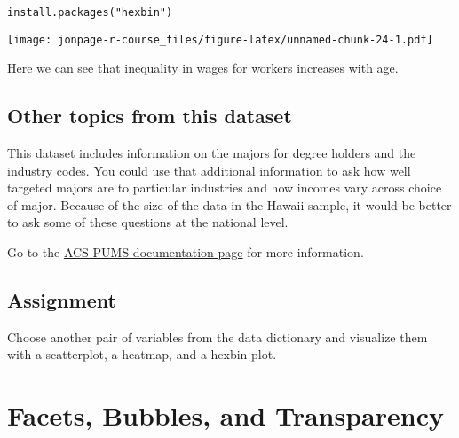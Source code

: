 \documentclass[]{book}
\newenvironment{Shaded}{\begin{snugshade}}{\end{snugshade}}
\newcommand{\KeywordTok}[1]{\textcolor[rgb]{0.13,0.29,0.53}{\textbf{{#1}}}}
\newcommand{\DecValTok}[1]{\textcolor[rgb]{0.00,0.00,0.81}{{#1}}}
\newcommand{\StringTok}[1]{\textcolor[rgb]{0.31,0.60,0.02}{{#1}}}
\newcommand{\NormalTok}[1]{{#1}}
\theoremstyle{definition}
\theoremstyle{definition}
\theoremstyle{remark}
\begin{document}
\begin{verbatim}
install.packages("hexbin")
\end{verbatim}

\begin{Shaded}
\end{Shaded}

\texttt{[image: jonpage-r-course\_files/figure-latex/unnamed-chunk-24-1.pdf]}

Here we can see that inequality in wages for workers increases with age.

\section{Other topics from this
dataset}\label{other-topics-from-this-dataset}

This dataset includes information on the majors for degree holders and
the industry codes. You could use that additional information to ask how
well targeted majors are to particular industries and how incomes vary
across choice of major. Because of the size of the data in the Hawaii
sample, it would be better to ask some of these questions at the
national level.

Go to the
\href{https://www.census.gov/programs-surveys/acs/technical-documentation/pums/documentation.2015.html}{ACS
PUMS documentation page} for more information.

\section{Assignment}\label{assignment-1}

Choose another pair of variables from the data dictionary and visualize
them with a scatterplot, a heatmap, and a hexbin plot.

\hypertarget{facets-and-bubbles}{\chapter{Facets, Bubbles, and
Transparency}\label{facets-and-bubbles}}
\end{document}
